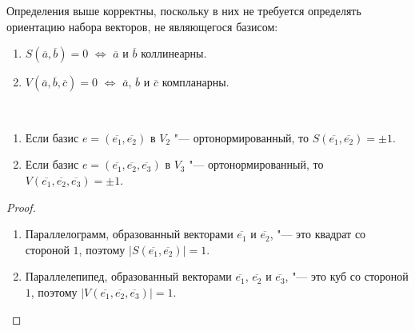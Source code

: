     \begin{note}
    	Определения выше корректны, поскольку в них не требуется определять ориентацию набора векторов, не являющегося базисом:
    	\begin{enumerate}
    		\item $S(\overline{a}, \overline{b}) = 0$ $\Leftrightarrow$ $\overline{a}$ и $\overline{b}$ коллинеарны.
    		\item $V(\overline{a}, \overline{b}, \overline{c}) = 0$ $\Leftrightarrow$ $\overline{a}$, $\overline{b}$ и $\overline{c}$ компланарны.
    	\end{enumerate}
    \end{note}
    
    \begin{proposition}~
    	\begin{enumerate}
    		\item Если базис $e = (\overline{e_1}, \overline{e_2})$ в $V_2$ "--- ортонормированный, то $S(\overline{e_1}, \overline{e_2}) = \pm 1$.
    		\item Если базис $e = (\overline{e_1}, \overline{e_2}, \overline{e_3})$ в $V_3$ "--- ортонормированный, то $V(\overline{e_1}, \overline{e_2}, \overline{e_3}) = \pm 1$.
    	\end{enumerate}
    \end{proposition}
    
    \begin{proof}~
    	\begin{enumerate}
    		\item Параллелограмм, образованный векторами $\overline{e_1}$ и $\overline{e_2}$, "--- это квадрат со стороной $1$, поэтому $|S(\overline{e_1}, \overline{e_2})| = 1$.
    		\item Параллелепипед, образованный векторами $\overline{e_1}$, $\overline{e_2}$ и $\overline{e_3}$, "--- это куб со стороной $1$, поэтому $|V(\overline{e_1}, \overline{e_2}, \overline{e_3})| = 1$.\qedhere
    	\end{enumerate}
    \end{proof}

